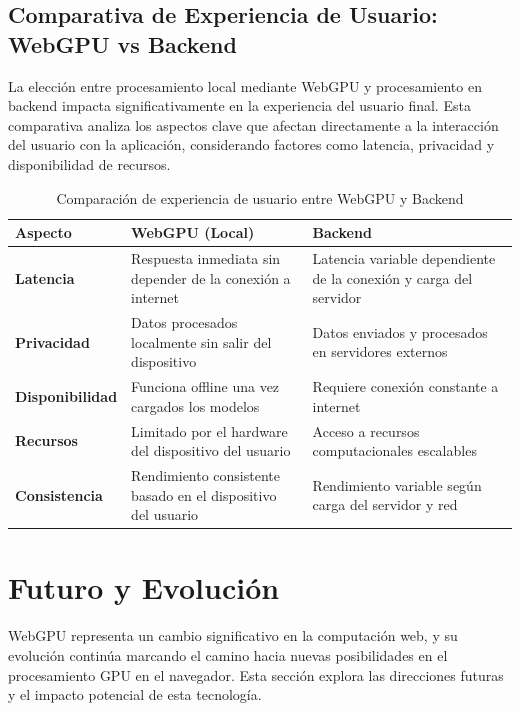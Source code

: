 \subsection{Comparativa de Experiencia de Usuario: WebGPU vs Backend}
\label{sec:webgpu-backend-comparison}

La elección entre procesamiento local mediante WebGPU y procesamiento en backend impacta significativamente en la experiencia del usuario final. Esta comparativa analiza los aspectos clave que afectan directamente a la interacción del usuario con la aplicación, considerando factores como latencia, privacidad y disponibilidad de recursos.

\begin{table}[H]
\caption{Comparación de experiencia de usuario entre WebGPU y Backend}
\label{tab:webgpu-backend-ux}
\begin{tabular}{|p{3cm}|p{5cm}|p{5cm}|}
\hline
\textbf{Aspecto} & \textbf{WebGPU (Local)} & \textbf{Backend} \\
\hline
\textbf{Latencia} & 
Respuesta inmediata sin depender de la conexión a internet & 
Latencia variable dependiente de la conexión y carga del servidor \\
\hline
\textbf{Privacidad} & 
Datos procesados localmente sin salir del dispositivo & 
Datos enviados y procesados en servidores externos \\
\hline
\textbf{Disponibilidad} & 
Funciona offline una vez cargados los modelos & 
Requiere conexión constante a internet \\
\hline
\textbf{Recursos} & 
Limitado por el hardware del dispositivo del usuario & 
Acceso a recursos computacionales escalables \\
\hline
\textbf{Consistencia} & 
Rendimiento consistente basado en el dispositivo del usuario & 
Rendimiento variable según carga del servidor y red \\
\hline
\end{tabular}
\end{table}

\section{Futuro y Evolución}
\label{sec:future-evolution}

WebGPU representa un cambio significativo en la computación web, y su evolución continúa marcando el camino hacia nuevas posibilidades en el procesamiento GPU en el navegador. Esta sección explora las direcciones futuras y el impacto potencial de esta tecnología.

